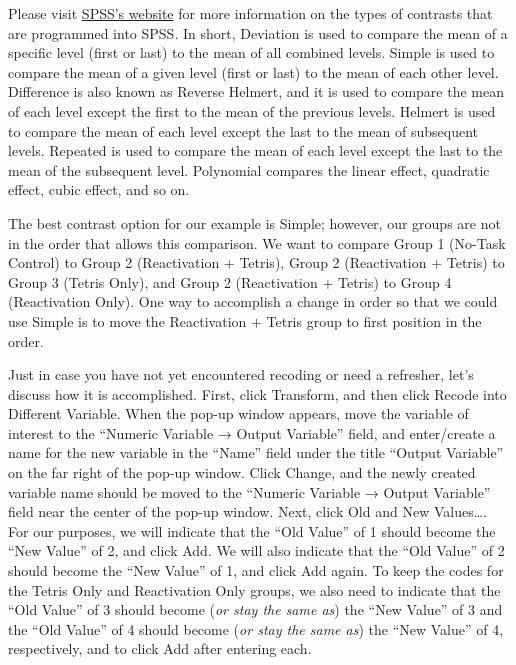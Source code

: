 \documentclass[
]{book}
\begin{document}
Please visit \href{https://www.ibm.com/docs/en/spss-statistics/28.0.0?topic=contrasts-contrast-types}{SPSS's website} for more information on the types of contrasts that are programmed into SPSS. In short, Deviation is used to compare the mean of a specific level (first or last) to the mean of all combined levels. Simple is used to compare the mean of a given level (first or last) to the mean of each other level. Difference is also known as Reverse Helmert, and it is used to compare the mean of each level except the first to the mean of the previous levels. Helmert is used to compare the mean of each level except the last to the mean of subsequent levels. Repeated is used to compare the mean of each level except the last to the mean of the subsequent level. Polynomial compares the linear effect, quadratic effect, cubic effect, and so on.

The best contrast option for our example is Simple; however, our groups are not in the order that allows this comparison. We want to compare Group 1 (No-Task Control) to Group 2 (Reactivation + Tetris), Group 2 (Reactivation + Tetris) to Group 3 (Tetris Only), and Group 2 (Reactivation + Tetris) to Group 4 (Reactivation Only). One way to accomplish a change in order so that we could use Simple is to move the Reactivation + Tetris group to first position in the order.

Just in case you have not yet encountered recoding or need a refresher, let's discuss how it is accomplished. First, click {Transform}, and then click {Recode into Different Variable}. When the pop-up window appears, move the variable of interest to the ``Numeric Variable → Output Variable'' field, and enter/create a name for the new variable in the ``Name'' field under the title ``Output Variable'' on the far right of the pop-up window. Click {Change}, and the newly created variable name should be moved to the ``Numeric Variable → Output Variable'' field near the center of the pop-up window. Next, click {Old and New Values\ldots{}}. For our purposes, we will indicate that the ``Old Value'' of 1 should become the ``New Value'' of 2, and click {Add}. We will also indicate that the ``Old Value'' of 2 should become the ``New Value'' of 1, and click {Add} again. To keep the codes for the Tetris Only and Reactivation Only groups, we also need to indicate that the ``Old Value'' of 3 should become (\emph{or stay the same as}) the ``New Value'' of 3 and the ``Old Value'' of 4 should become (\emph{or stay the same as}) the ``New Value'' of 4, respectively, and to click {Add} after entering each.
\end{document}
